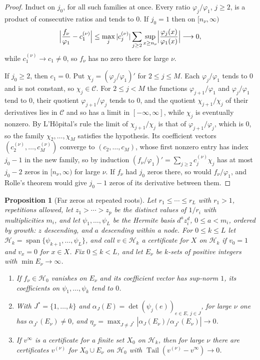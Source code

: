 \documentclass[11pt]{article}
\newtheorem{proposition}[theorem]{Proposition}
\theoremstyle{definition}
\theoremstyle{plain}
\DeclareMathOperator{\Tail}{Tail}
\begin{document}
\begin{proof}
Induct on $j_0$, for all such families at once.  Every ratio
$\varphi_j/\varphi_1$, $j\ge2$, is a product of consecutive ratios and tends
to $0$.  If $j_0=1$ then on $[n_\nu,\infty)$
\[
  \Bigl|\frac{f_\nu}{\varphi_1}-c^{(\nu)}_1\Bigr|
  \le\max_j|c^{(\nu)}_j|\sum_{j\ge2}\sup_{x\ge n_\nu}
  \Bigl|\frac{\varphi_j(x)}{\varphi_1(x)}\Bigr|\longrightarrow0,
\]
while $c^{(\nu)}_1\to c_1\ne0$, so $f_\nu$ has no zero there for large $\nu$.

If $j_0\ge2$, then $c_1=0$.  Put $\chi_j=(\varphi_j/\varphi_1)'$ for
$2\le j\le M$.  Each $\varphi_j/\varphi_1$ tends to $0$ and is not constant,
so $\chi_j\in\mathcal C$.  For $2\le j<M$ the functions
$\varphi_{j+1}/\varphi_1$ and $\varphi_j/\varphi_1$ tend to $0$, their
quotient $\varphi_{j+1}/\varphi_j$ tends to $0$, and the quotient
$\chi_{j+1}/\chi_j$ of their derivatives lies in $\mathcal C$ and so has a
limit in $[-\infty,\infty]$, while $\chi_j$ is eventually nonzero.
By L'H\^opital's rule the limit of $\chi_{j+1}/\chi_j$ is that of
$\varphi_{j+1}/\varphi_j$, which is $0$, so the family $\chi_2,\ldots,\chi_M$ satisfies the hypothesis.  Its coefficient
vectors $(c^{(\nu)}_2,\ldots,c^{(\nu)}_M)$ converge to $(c_2,\ldots,c_M)$,
whose first nonzero entry has index $j_0-1$ in the new family, so by induction
$(f_\nu/\varphi_1)'=\sum_{j\ge2}c^{(\nu)}_j\chi_j$ has at most $j_0-2$ zeros
in $[n_\nu,\infty)$ for large $\nu$.  If $f_\nu$ had $j_0$ zeros there, so
would $f_\nu/\varphi_1$, and Rolle's theorem would give $j_0-1$ zeros of its
derivative between them.
\end{proof}

\begin{proposition}[Far zeros at repeated roots]\label{prop:farrep}
Let $r_1\le\cdots\le r_L$ with $r_1>1$, repetitions allowed, let
$z_1>\cdots>z_p$ be the distinct values of $1/r_i$ with multiplicities $m_i$,
and let $\psi_1,\ldots,\psi_L$ be the Hermite basis $d^az_i^d$,
$0\le a<m_i$, ordered by growth: $z$ descending, and $a$ descending within a
node.  For $0\le k\le L$ let
$\mathcal H_k=\operatorname{span}\{\psi_{k+1},\ldots,\psi_L\}$, and call
$v\in\mathcal H_k$ a certificate for $X$ on $\mathcal H_k$ if $v_0=1$ and
$v_x=0$ for $x\in X$.  Fix $0\le k<L$, and let $E_\nu$ be $k$-sets of positive
integers with $\min E_\nu\to\infty$.
\begin{enumerate}
\item[(a)] If $f_\nu\in\mathcal H_0$ vanishes on $E_\nu$ and its coefficient
vector has sup-norm $1$, its coefficients on $\psi_1,\ldots,\psi_k$ tend to
$0$.
\item[(b)] With $J^*=\{1,\ldots,k\}$ and
$\alpha_J(E)=\det(\psi_j(e))_{e\in E,\,j\in J}$, for large $\nu$ one has
$\alpha_{J^*}(E_\nu)\ne0$, and
$\eta_\nu=\max_{J\ne J^*}|\alpha_J(E_\nu)/\alpha_{J^*}(E_\nu)|\to0$.
\item[(c)] If $v^\infty$ is a certificate for a finite set $X_0$ on
$\mathcal H_k$, then for large $\nu$ there are certificates $v^{(\nu)}$ for
$X_0\cup E_\nu$ on $\mathcal H_0$ with $\Tail(v^{(\nu)}-v^\infty)\to0$.
\end{enumerate}
\end{proposition}
\end{document}
